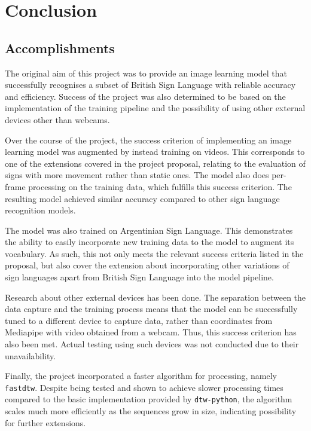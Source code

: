 \documentclass[final,rdr32.tex]{subfiles}
\begin{document}
\chapter{Conclusion}

\section{Accomplishments}

The original aim of this project was to provide an image learning model that successfully recognises a subset of British Sign Language with reliable accuracy and efficiency. Success of the project was also determined to be based on the implementation of the training pipeline and the possibility of using other external devices other than webcams.

Over the course of the project, the success criterion of implementing an image learning model was augmented by instead training on videos. This corresponds to one of the extensions covered in the project proposal, relating to the evaluation of signs with more movement rather than static ones. The model also does per-frame processing on the training data, which fulfills this success criterion. The resulting model achieved similar accuracy compared to other sign language recognition models.

The model was also trained on Argentinian Sign Language. This demonstrates the ability to easily incorporate new training data to the model to augment its vocabulary. As such, this not only meets the relevant success criteria listed in the proposal, but also cover the extension about incorporating other variations of sign languages apart from British Sign Language into the model pipeline.

Research about other external devices has been done. The separation between the data capture and the training process means that the model can be successfully tuned to a different device to capture data, rather than coordinates from Mediapipe with video obtained from a webcam. Thus, this success criterion has also been met. Actual testing using such devices was not conducted due to their unavailability.

Finally, the project incorporated a faster algorithm for processing, namely \verb|fastdtw|. Despite being tested and shown to achieve slower processing times compared to the basic implementation provided by \verb|dtw-python|, the algorithm scales much more efficiently as the sequences grow in size, indicating possibility for further extensions.
\end{document}
